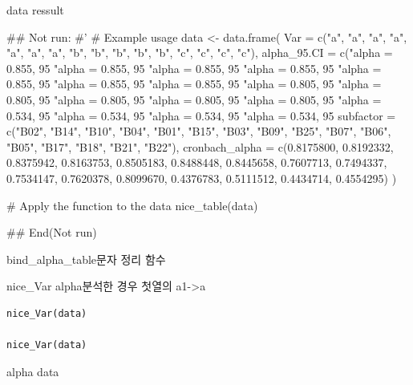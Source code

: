 \documentclass[a4paper]{book}
\begin{document}
%
\begin{Value}
data ressult
\end{Value}
%
\begin{Examples}
\begin{ExampleCode}

\#\# Not run: 
#'
# Example usage
data <- data.frame(
  Var = c("a", "a", "a", "a", "a", "a", "a", "b",
  "b", "b", "b", "b", "c", "c", "c", "c"),
  alpha_95.CI = c("alpha = 0.855, 95%
  "alpha = 0.855, 95%
                  "alpha = 0.855, 95%
                  "alpha = 0.855, 95%
                  "alpha = 0.855, 95%
                  "alpha = 0.855, 95%
                  "alpha = 0.855, 95%
                  "alpha = 0.805, 95%
                  "alpha = 0.805, 95%
                  "alpha = 0.805, 95%
                  "alpha = 0.805, 95%
                  "alpha = 0.805, 95%
                  "alpha = 0.534, 95%
                  "alpha = 0.534, 95%
                  "alpha = 0.534, 95%
                  "alpha = 0.534, 95%
  subfactor = c("B02", "B14", "B10", "B04", "B01", "B15",
   "B03", "B09", "B25", "B07", "B06", "B05", "B17",
   "B18", "B21", "B22"),
  cronbach_alpha = c(0.8175800, 0.8192332,
  0.8375942, 0.8163753, 0.8505183, 0.8488448,
   0.8445658, 0.7607713, 0.7494337,
                     0.7534147, 0.7620378,
                      0.8099670, 0.4376783,
                       0.5111512, 0.4434714, 0.4554295)
)

# Apply the function to the data
nice_table(data)


## End(Not run)


\end{ExampleCode}
\end{Examples}
%
\begin{Description}
bind\_alpha\_table문자 정리 함수

nice\_Var alpha분석한 경우 첫열의 a1->a
\end{Description}
%
\begin{Usage}
\begin{verbatim}
nice_Var(data)

nice_Var(data)
\end{verbatim}
\end{Usage}
%
\begin{Arguments}
\begin{ldescription}
\item[\code{data}] alpha data
\end{ldescription}
\end{Arguments}
\end{document}
